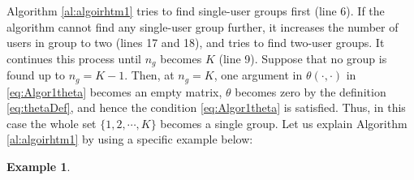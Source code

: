 \documentclass[11pt, draft, onecolumn ]{IEEEtran}
\newtheorem{example}{Example}
\begin{document}
Algorithm \ref{al:algoirhtm1} tries to find single-user groups first (line 6). If the algorithm cannot find any single-user group further, it increases the number of users in group to two (lines 17 and 18), and tries to find two-user groups. It continues this process until $n_g$ becomes $K$ (line 9). Suppose that no group is found up to $n_g = K-1$. Then, at $n_g=K$, one argument in $\theta(\cdot,\cdot)$ in   \eqref{eq:Algor1theta} becomes an empty matrix, $\theta$ becomes zero by the definition \eqref{eq:thetaDef}, and hence the condition \eqref{eq:Algor1theta} is satisfied. Thus, in this case the whole set $\{1,2,\cdots,K\}$ becomes a single group. Let us explain Algorithm \ref{al:algoirhtm1} by using a specific example  below:





\begin{example}  \label{example:SOP}

\end{example}
\end{document}
